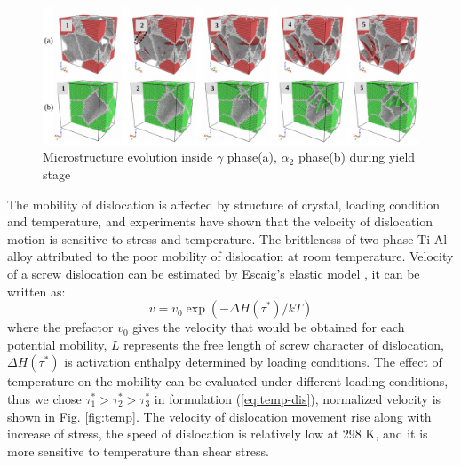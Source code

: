\documentclass[metals,article,submit,moreauthors,pdftex,10pt,a4paper]{Definitions/mdpi}
\begin{document}
\begin{figure}[ht] 
	\centering
	\includegraphics[width=1\linewidth]{img/def-box}
	\caption{Microstructure evolution inside $\gamma$ phase(a), $\alpha_2$ phase(b) during yield stage}
	\label{fig:Defect}
\end{figure}

The mobility of dislocation is affected by structure of crystal, loading condition and temperature, and experiments have shown that the velocity of dislocation motion is sensitive to stress and temperature\cite{Stein1960}. The brittleness of two phase Ti-Al alloy attributed to the poor mobility of dislocation at room temperature. Velocity of a screw dislocation can be estimated by Escaig's elastic model \cite{Escaig1968}, it can be written as:
\begin{equation}\label{eq:temp-dis}
v = v_0 \exp(-\Delta H(\tau^*)/kT)
\end{equation}
where the prefactor $v_0$ gives the velocity that would be obtained for each potential mobility, $L$ represents the free length of screw character of dislocation, $\Delta H(\tau^*)$ is activation enthalpy determined by loading conditions. The effect of temperature on the mobility can be evaluated under different loading conditions, thus we chose  $\tau_1^*>\tau_2^*>\tau_3^*$ in formulation (\ref{eq:temp-dis}), normalized velocity is shown in Fig. \ref{fig:temp}. The  velocity  of dislocation movement rise along with increase of  stress, the speed of dislocation is relatively low at 298 K, and it is more sensitive to temperature than shear stress. 
\end{document}
